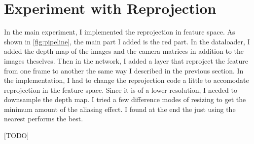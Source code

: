 \section{Experiment with Reprojection}
In the main experiment, I implemented the reprojection in feature space. As shown in \ref{fig:pipeline}, the main part I added is the red part. In the dataloader, I added the depth map of the images and the camera matrices in addition to the images theselves. Then in the network, I added a layer that reproject the feature from one frame to another the same way I described in the previous section. In the implementation, I had to change the reprojection code a little to accomodate reprojection in the feature space. Since it is of a lower resolution, I needed to downsample the depth map. I tried a few difference modes of resizing to get the minimum amount of the aliasing effect. I found at the end the just using the nearest performs the best. 


[TODO]
